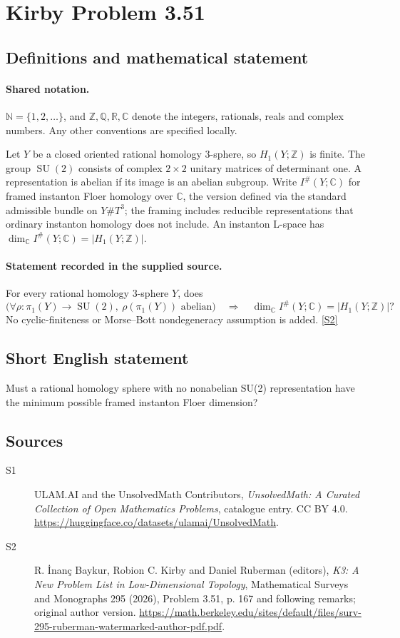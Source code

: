 \documentclass[11pt]{article}
\newcommand{\sref}[2]{\hyperlink{source:#1:#2}{[S#2]}}
\begin{document}
\section{Kirby Problem 3.51}\label{statement}

\subsection{Definitions and mathematical statement}

\paragraph{Shared notation.}$\mathbb N=\{1,2,\ldots\}$, and $\mathbb Z,\mathbb Q,\mathbb R,\mathbb C$ denote the integers, rationals, reals and complex numbers. Any other conventions are specified locally.


Let $Y$ be a closed oriented rational homology $3$-sphere, so $H_1(Y;\mathbb Z)$ is finite. The group $\operatorname{SU}(2)$ consists of complex $2\times2$ unitary matrices of determinant one. A representation is abelian if its image is an abelian subgroup. Write $I^\#(Y;\mathbb C)$ for framed instanton Floer homology over $\mathbb C$, the version defined via the standard admissible bundle on $Y\#T^3$; the framing includes reducible representations that ordinary instanton homology does not include. An instanton L-space has $\dim_{\mathbb C}I^\#(Y;\mathbb C)=|H_1(Y;\mathbb Z)|$.
\paragraph{Statement recorded in the supplied source.}
For every rational homology $3$-sphere $Y$, does
\[
\bigl(\forall\rho:\pi_1(Y)\to\operatorname{SU}(2),\ \rho(\pi_1(Y))\text{ abelian}\bigr)
\quad\Longrightarrow\quad
\dim_{\mathbb C}I^\#(Y;\mathbb C)=|H_1(Y;\mathbb Z)|?
\]
No cyclic-finiteness or Morse--Bott nondegeneracy assumption is added. \sref{statement}{2}
\subsection{Short English statement}
Must a rational homology sphere with no nonabelian SU(2) representation have the minimum possible framed instanton Floer dimension?
\subsection{Sources}
\begin{description}
\item[\hypertarget{source:statement:1}{S1}] ULAM.AI and the UnsolvedMath Contributors, \emph{UnsolvedMath: A Curated Collection of Open Mathematics Problems}, catalogue entry. CC BY 4.0. \url{https://huggingface.co/datasets/ulamai/UnsolvedMath}.
\item[\hypertarget{source:statement:2}{S2}] R. İnanç Baykur, Robion C. Kirby and Daniel Ruberman (editors), \emph{K3: A New Problem List in Low-Dimensional Topology}, Mathematical Surveys and Monographs 295 (2026), Problem 3.51, p. 167 and following remarks; original author version. \url{https://math.berkeley.edu/sites/default/files/surv-295-ruberman-watermarked-author-pdf.pdf}.
\end{description}
\label{end:statement}
\end{document}
